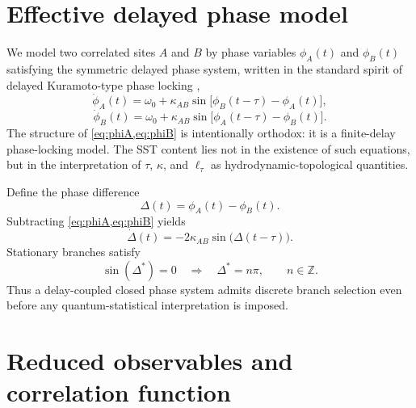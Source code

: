 \documentclass[11pt]{article}
\begin{document}
    \section{Effective delayed phase model}
        
        We model two correlated sites \(A\) and \(B\) by phase variables \(\phi_A(t)\) and \(\phi_B(t)\) satisfying the symmetric delayed phase system, written in the standard spirit of delayed Kuramoto-type phase locking \cite{Yeung1999},
        \begin{equation}
            \dot{\phi}_A(t)=\omega_0+\kappa_{AB} \sin\!\big[\phi_B(t-\tau)-\phi_A(t)\big],
            \label{eq:phiA}
        \end{equation}
        \begin{equation}
            \dot{\phi}_B(t)=\omega_0+\kappa_{AB} \sin\!\big[\phi_A(t-\tau)-\phi_B(t)\big].
            \label{eq:phiB}
        \end{equation}
        The structure of \cref{eq:phiA,eq:phiB} is intentionally orthodox: it is a finite-delay phase-locking model. The SST content lies not in the existence of such equations, but in the interpretation of \(\tau\), \(\kappa\), and \(\ell_\tau\) as hydrodynamic-topological quantities.
        
        Define the phase difference
        \begin{equation}
            \Delta(t)=\phi_A(t)-\phi_B(t).
        \end{equation}
        Subtracting \cref{eq:phiA,eq:phiB} yields
        \begin{equation}
            \dot{\Delta}(t)
            =
            -2\kappa_{AB} \sin\!\big(\Delta(t-\tau)\big).
            \label{eq:deltaeq}
        \end{equation}
        Stationary branches satisfy
        \begin{equation}
            \sin(\Delta^\ast)=0
            \quad\Rightarrow\quad
            \Delta^\ast=n\pi,\qquad n\in\mathbb{Z}.
            \label{eq:stationary_branch}
        \end{equation}
        Thus a delay-coupled closed phase system admits discrete branch selection even before any quantum-statistical interpretation is imposed.

    \section{Reduced observables and correlation function}
\end{document}
